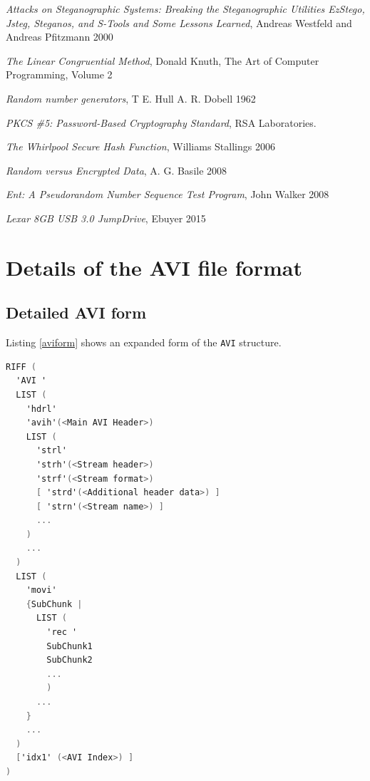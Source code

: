 \documentclass[paper=a4, fontsize=11pt,twoside]{scrartcl}
\numberwithin{table}{section}
\numberwithin{figure}{section}
\numberwithin{algorithm}{section}
\begin{document}
\begin{thebibliography}{1}
 \emph{Attacks on Steganographic Systems: Breaking the Steganographic Utilities EzStego, Jsteg, Steganos, and S-Tools and Some Lessons Learned}, Andreas Westfeld and Andreas Pfitzmann 2000

 \emph{The Linear Congruential Method}, Donald Knuth, The Art of Computer Programming, Volume 2

 \emph{Random number generators}, T E. Hull A. R. Dobell 1962

 \emph{PKCS \#5: Password-Based Cryptography Standard}, RSA Laboratories.

 \emph{The Whirlpool Secure Hash Function}, Williams Stallings 2006\\

 \emph{Random versus Encrypted Data}, A. G. Basile 2008\\

 \emph{Ent: A Pseudorandom Number Sequence Test Program}, John Walker 2008\\

 \emph{Lexar 8GB USB 3.0 JumpDrive}, Ebuyer 2015\\

\vfill

\end{thebibliography}

\pagebreak

\appendix
\section{Details of the AVI file format}
\label{app:avi}

\subsection{Detailed AVI form}

Listing \ref{aviform} shows an expanded form of the \texttt{AVI} structure.

\begin{lstlisting}[language=C, caption={Detailed \texttt{AVI RIFF} form}, frame=single, upquote=true,label=aviform,showstringspaces=false]
RIFF (
  'AVI '
  LIST (
    'hdrl'
    'avih'(<Main AVI Header>)
    LIST (
      'strl'
      'strh'(<Stream header>)
      'strf'(<Stream format>)
      [ 'strd'(<Additional header data>) ]
      [ 'strn'(<Stream name>) ]
      ...
    )
    ...
  )
  LIST (
    'movi'
    {SubChunk | 
      LIST (
        'rec '
        SubChunk1
        SubChunk2
        ...
        )
      ...
    }
    ...
  )
  ['idx1' (<AVI Index>) ]
)
\end{lstlisting}
\end{document}
